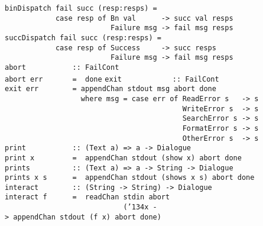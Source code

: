 \eprogB\noindent\bprogB
\mbox{\tt binDispatch\ fail\ succ\ (resp:resps)\ =\ }\\
\mbox{\tt \ \ \ \ \ \ \ \ \ \ \ \ case\ resp\ of\ Bn\ val\ \ \ \ \ \ ->\ succ\ val\ resps}\\
\mbox{\tt \ \ \ \ \ \ \ \ \ \ \ \ \ \ \ \ \ \ \ \ \ \ \ \ \ Failure\ msg\ ->\ fail\ msg\ resps}
\eprogB\noindent\bprogB
\mbox{\tt succDispatch\ fail\ succ\ (resp:resps)\ =\ }\\
\mbox{\tt \ \ \ \ \ \ \ \ \ \ \ \ case\ resp\ of\ Success\ \ \ \ \ ->\ succ\ resps}\\
\mbox{\tt \ \ \ \ \ \ \ \ \ \ \ \ \ \ \ \ \ \ \ \ \ \ \ \ \ Failure\ msg\ ->\ fail\ msg\ resps}
\eprogB\noindent\bprogB
\mbox{\tt abort\ \ \ \ \ \ \ \ \ \ \ ::\ FailCont}\\
\mbox{\tt abort\ err\ \ \ \ \ \ \ =\ \ done}
%
\eprogB\noindent\bprogB
\mbox{\tt exit\ \ \ \ \ \ \ \ \ \ \ \ ::\ FailCont}\\
\mbox{\tt exit\ err\ \ \ \ \ \ \ \ =\ appendChan\ stdout\ msg\ abort\ done}\\
\mbox{\tt \ \ \ \ \ \ \ \ \ \ \ \ \ \ \ \ \ \ where\ msg\ =\ case\ err\ of\ ReadError\ s\ \ \ ->\ s}\\
\mbox{\tt \ \ \ \ \ \ \ \ \ \ \ \ \ \ \ \ \ \ \ \ \ \ \ \ \ \ \ \ \ \ \ \ \ \ \ \ \ \ \ \ \ \ WriteError\ s\ \ ->\ s}\\
\mbox{\tt \ \ \ \ \ \ \ \ \ \ \ \ \ \ \ \ \ \ \ \ \ \ \ \ \ \ \ \ \ \ \ \ \ \ \ \ \ \ \ \ \ \ SearchError\ s\ ->\ s}\\
\mbox{\tt \ \ \ \ \ \ \ \ \ \ \ \ \ \ \ \ \ \ \ \ \ \ \ \ \ \ \ \ \ \ \ \ \ \ \ \ \ \ \ \ \ \ FormatError\ s\ ->\ s}\\
\mbox{\tt \ \ \ \ \ \ \ \ \ \ \ \ \ \ \ \ \ \ \ \ \ \ \ \ \ \ \ \ \ \ \ \ \ \ \ \ \ \ \ \ \ \ OtherError\ s\ \ ->\ s}
%
\eprogB\noindent\bprogB
\mbox{\tt print\ \ \ \ \ \ \ \ \ \ \ ::\ (Text\ a)\ =>\ a\ ->\ Dialogue}\\
\mbox{\tt print\ x\ \ \ \ \ \ \ \ \ =\ \ appendChan\ stdout\ (show\ x)\ abort\ done}\\
\mbox{\tt prints\ \ \ \ \ \ \ \ \ \ ::\ (Text\ a)\ =>\ a\ ->\ String\ ->\ Dialogue}\\
\mbox{\tt prints\ x\ s\ \ \ \ \ \ =\ \ appendChan\ stdout\ (shows\ x\ s)\ abort\ done}
%
%
\eprogB\noindent\bprogB
\mbox{\tt interact\ \ \ \ \ \ \ \ ::\ (String\ ->\ String)\ ->\ Dialogue}\\
\mbox{\tt interact\ f\ \ \ \ \ \ =\ \ readChan\ stdin\ abort}\\
\mbox{\tt \ \ \ \ \ \ \ \ \ \ \ \ \ \ \ \ \ \ \ \ \ \ \ \ \ \ \ \ ({\char'134}x\ ->\ appendChan\ stdout\ (f\ x)\ abort\ done)}
%
\eprogB
